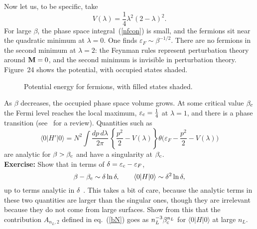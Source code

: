 Now let us, to be specific, take
\begin{equation}
V(\lambda) = \frac{1}{4} \lambda^2 (2 - \lambda)^2. \label{2well}
\end{equation}
For large $\beta$, the phase space integral~(\ref{nfcon}) is small,
and the fermions sit near the quadratic minimum at
$\lambda = 0$.  One finds $\varepsilon_F \sim \beta^{-1/2}$.
There are no fermions in the second minimum at $\lambda = 2$:
the Feynman rules represent perturbation theory around ${\bf M} =0$,
and the second minimum is invisible in perturbation theory.
Figure~24 shows the potential, with occupied states shaded.
\begin{figure}
\begin{center}
\leavevmode
{}
\end{center}
\caption[]{Potential energy for fermions, with filled states
shaded.}
\end{figure}
As $\beta$ decreases, the occupied phase space volume grows.
At some critical value $\beta_{\rm c}$ the Fermi level reaches the
local maximum, $\varepsilon_{\rm c} = \frac{1}{4}$ at $\lambda =
1$, and there is a phase transition (see~\cite{BIZ} for a review). 
Quantities such as \begin{equation}
\langle 0 | H' | 0 \rangle
= N^2 \int \frac{dp\,d\lambda}{2\pi}\, \left\{ \frac{p^2 }{2} -
V(\lambda) \right\} \theta\biggl( \varepsilon_F -
\frac{p^2 }{2} - V(\lambda) \biggr)  \label{g0h}
\end{equation}
are analytic for $\beta > \beta_{\rm c}$ and have a singularity
at $\beta_{\rm c}$.\\[3pt]
{\bf Exercise:} Show that in terms of $\delta = \varepsilon_{\rm
c} - \varepsilon_F$, 
\begin{equation}
\beta - \beta_{\rm c} \sim  \delta \ln \delta, \qquad
\langle 0 | H | 0 \rangle \sim \delta^2 \ln \delta,
\end{equation}
up to terms analytic in $\delta$~\cite{KMs2}.
This takes a bit of care,
because the analytic terms in these two quantities are larger
than the singular ones,
though they are irrelevant because they do not come from large
surfaces.
Show from this that the
contribution $A_{n_L, 2}$ defined in eq.~(\ref{bN}) goes as
$n_L^{-3} \beta_{\rm c}^{n_L}$ for $\langle 0 |
H | 0 \rangle$ at large $n_L$.

